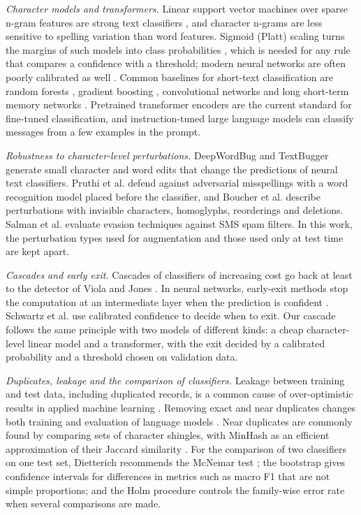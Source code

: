 \emph{Character models and transformers.} Linear support vector machines over sparse n-gram features are strong text classifiers \cite{cortes1995,joachims1998}, and character n-grams are less sensitive to spelling variation than word features. Sigmoid (Platt) scaling turns the margins of such models into class probabilities \cite{niculescu2005}, which is needed for any rule that compares a confidence with a threshold; modern neural networks are often poorly calibrated as well \cite{guo2017}. Common baselines for short-text classification are random forests \cite{breiman2001}, gradient boosting \cite{chen2016}, convolutional networks \cite{kim2014} and long short-term memory networks \cite{hochreiter1997}. Pretrained transformer encoders \cite{devlin2019,sanh2019,liu2019} are the current standard for fine-tuned classification, and instruction-tuned large language models \cite{qwen2024} can classify messages from a few examples in the prompt.

\emph{Robustness to character-level perturbations.} DeepWordBug \cite{gao2018} and TextBugger \cite{li2019} generate small character and word edits that change the predictions of neural text classifiers. Pruthi et al. \cite{pruthi2019} defend against adversarial misspellings with a word recognition model placed before the classifier, and Boucher et al. \cite{boucher2022} describe perturbations with invisible characters, homoglyphs, reorderings and deletions. Salman et al. \cite{salman2024} evaluate evasion techniques against SMS spam filters. In this work, the perturbation types used for augmentation and those used only at test time are kept apart.

\emph{Cascades and early exit.} Cascades of classifiers of increasing cost go back at least to the detector of Viola and Jones \cite{viola2001}. In neural networks, early-exit methods stop the computation at an intermediate layer when the prediction is confident \cite{teerapittayanon2016,schwartz2020}. Schwartz et al. \cite{schwartz2020} use calibrated confidence to decide when to exit. Our cascade follows the same principle with two models of different kinds: a cheap character-level linear model and a transformer, with the exit decided by a calibrated probability and a threshold chosen on validation data.

\emph{Duplicates, leakage and the comparison of classifiers.} Leakage between training and test data, including duplicated records, is a common cause of over-optimistic results in applied machine learning \cite{kapoor2023}. Removing exact and near duplicates changes both training and evaluation of language models \cite{lee2022}. Near duplicates are commonly found by comparing sets of character shingles, with MinHash as an efficient approximation of their Jaccard similarity \cite{broder1997}. For the comparison of two classifiers on one test set, Dietterich \cite{dietterich1998} recommends the McNemar test \cite{mcnemar1947}; the bootstrap \cite{efron1993} gives confidence intervals for differences in metrics such as macro F1 that are not simple proportions; and the Holm procedure \cite{holm1979,aickin1996} controls the family-wise error rate when several comparisons are made.

